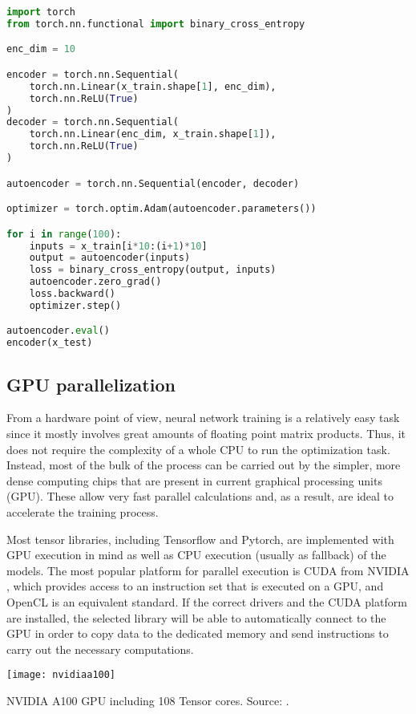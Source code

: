 \begin{lstlisting}[language=Python]
import torch
from torch.nn.functional import binary_cross_entropy

enc_dim = 10

encoder = torch.nn.Sequential(
    torch.nn.Linear(x_train.shape[1], enc_dim),
    torch.nn.ReLU(True)
)
decoder = torch.nn.Sequential(
    torch.nn.Linear(enc_dim, x_train.shape[1]),
    torch.nn.ReLU(True)
)

autoencoder = torch.nn.Sequential(encoder, decoder)

optimizer = torch.optim.Adam(autoencoder.parameters())

for i in range(100):
    inputs = x_train[i*10:(i+1)*10]
    output = autoencoder(inputs)
    loss = binary_cross_entropy(output, inputs)
    autoencoder.zero_grad()
    loss.backward()
    optimizer.step()

autoencoder.eval()
encoder(x_test)
\end{lstlisting}


\subsection{GPU parallelization}

From a hardware point of view, neural network training is a relatively easy task since it mostly involves great amounts of floating point matrix products. Thus, it does not require the complexity of a whole CPU to run the optimization task. Instead, most of the bulk of the process can be carried out by the simpler, more dense computing chips that are present in current graphical processing units (GPU). These allow very fast parallel calculations and, as a result, are ideal to accelerate the training process.

Most tensor libraries, including Tensorflow and Pytorch, are implemented with GPU execution in mind as well as CPU execution (usually as fallback) of the models. The most popular platform for parallel execution is CUDA from NVIDIA , which provides access to an instruction set that is executed on a GPU, and OpenCL  is an equivalent standard. If the correct drivers and the CUDA platform are installed, the selected library will be able to automatically connect to the GPU in order to copy data to the dedicated memory and send instructions to carry out the necessary computations.

\begin{marginfigure}
    \texttt{[image: nvidiaa100]}
    \caption[NVIDIA A100 GPU including 108 Tensor cores.]{\label{fig:nvidia}NVIDIA A100 GPU including 108 Tensor cores. Source: \cite{nvidiaa100}.}
\end{marginfigure}
 
